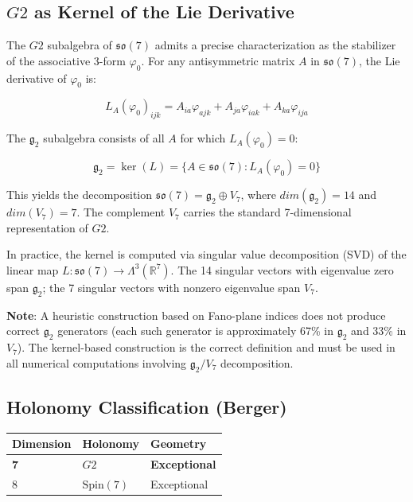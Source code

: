 \documentclass[11pt,a4paper]{article}
\newcommand{\Gtwo}{\mathrm{G}_2}
\newcommand{\dimE}{\mathrm{dim}}
\def\Gtwo{G2}%
\def\dimE{dim}%
\begin{document}
\subsection{$\Gtwo$ as Kernel of the Lie Derivative}

The $\Gtwo$ subalgebra of $\mathfrak{so}(7)$ admits a precise characterization as the stabilizer of the associative 3-form $\varphi_0$. For any antisymmetric matrix $A$ in $\mathfrak{so}(7)$, the Lie derivative of $\varphi_0$ is:

$$L_A(\varphi_0)_{ijk} = A_{ia}\varphi_{ajk} + A_{ja}\varphi_{iak} + A_{ka}\varphi_{ija}$$

The $\mathfrak{g}_2$ subalgebra consists of all $A$ for which $L_A(\varphi_0) = 0$:

$$\mathfrak{g}_2 = \ker(L) = \{A \in \mathfrak{so}(7) : L_A(\varphi_0) = 0\}$$

This yields the decomposition $\mathfrak{so}(7) = \mathfrak{g}_2 \oplus V_7$, where $\dimE(\mathfrak{g}_2) = 14$ and $\dimE(V_7) = 7$. The complement $V_7$ carries the standard 7-dimensional representation of $\Gtwo$.

In practice, the kernel is computed via singular value decomposition (SVD) of the linear map $L: \mathfrak{so}(7) \to \Lambda^3(\mathbb{R}^7)$. The 14 singular vectors with eigenvalue zero span $\mathfrak{g}_2$; the 7 singular vectors with nonzero eigenvalue span $V_7$.

\textbf{Note}: A heuristic construction based on Fano-plane indices does not produce correct $\mathfrak{g}_2$ generators (each such generator is approximately 67\% in $\mathfrak{g}_2$ and 33\% in $V_7$). The kernel-based construction is the correct definition and must be used in all numerical computations involving $\mathfrak{g}_2/V_7$ decomposition.

\subsection{Holonomy Classification (Berger)}

\begin{table}[H]
\centering
\begin{tabular}{lll}
\toprule
Dimension & Holonomy & Geometry \\
\midrule
\textbf{7} & $\Gtwo$ & \textbf{Exceptional} \\
8 & $\mathrm{Spin}(7)$ & Exceptional \\
\bottomrule
\end{tabular}
\end{table}
\end{document}
